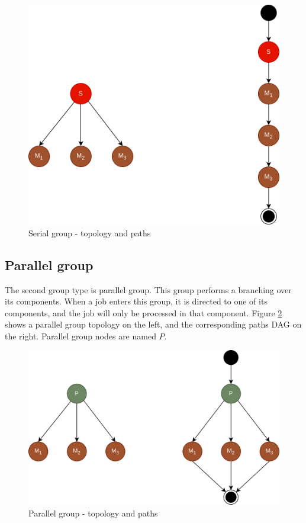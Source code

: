 \begin{figure}[!htbp]
	\centering
	\includegraphics[scale=0.3]{../images/serial_group.png}
	\caption{Serial group - topology and paths}
    \label{fig:serial_group}
\end{figure}

\subsection{Parallel group}

The second group type is parallel group. This group performs a branching over its components. When a job enters this group, it is directed to one of its components, and the job will only be processed in that component. Figure \ref{fig:parallel_group} shows a parallel group topology on the left, and the corresponding paths DAG on the right. Parallel group nodes are named $P$.

\begin{figure}[!htbp]
	\centering
	\includegraphics[scale=0.3]{../images/parallel_group.png}
	\caption{Parallel group - topology and paths}
    \label{fig:parallel_group}
\end{figure}

